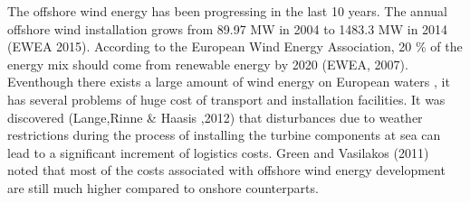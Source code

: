 \begin{introduction}

The offshore wind energy has been progressing in the last 10 years. The annual offshore wind installation grows from 89.97 MW in 2004 to 1483.3 MW in 2014 (EWEA 2015). According to the European Wind Energy Association, 20 \% of the energy mix should come from renewable energy by 2020 (EWEA, 2007). Eventhough there exists a large amount of wind energy on European waters , it has several problems of huge cost of transport and installation facilities. It was discovered (Lange,Rinne & Haasis ,2012) that disturbances due to weather restrictions during the process of installing the turbine components at sea can lead to a significant increment of logistics costs. Green and Vasilakos (2011) noted that most of the costs associated with offshore wind energy development are still much higher compared to onshore counterparts.

\end{introduction}
